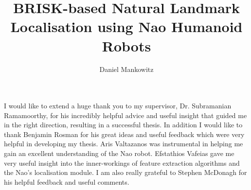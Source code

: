 \documentclass[msc, ai, logo, 10pt]{infthesis}  %
\title{BRISK-based Natural Landmark Localisation using Nao Humanoid Robots}
\author{Daniel Mankowitz}
\begin{document}
\begin{preliminary}

\maketitle

\begin{acknowledgements}
I would like to extend a huge thank you to my supervisor, Dr. Subramanian Ramamoorthy, for his incredibly helpful advice and useful insight that guided me in the right direction, resulting in a successful thesis. In addition I would like to thank Benjamin Rosman for his great ideas and useful feedback which were very helpful in developing my thesis. Aris Valtazanos was instrumental in helping me gain an excellent understanding of the Nao robot. Efstathios Vafeias gave me very useful insight into the inner-workings of feature extraction algorithms and the Nao's localisation module. I am also really grateful to Stephen McDonagh for his helpful feedback and useful comments.\\
\end{acknowledgements}

\standarddeclaration


\tableofcontents

 \listoffigures
 \listoftables

\end{preliminary}









% 

\appendix







\end{document}
